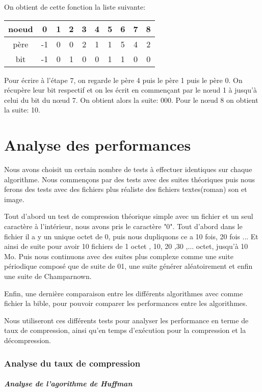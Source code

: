 \documentclass{report}
\begin{document}
On obtient de cette fonction la liste suivante:
\begin{center}
\begin{tabular}{|c|c|c|c|c|c|c|c|c|c|}
\hline
noeud & 0 & 1 & 2 & 3 & 4 & 5 & 6 & 7 & 8 \\
\hline
père & -1 & 0 & 0 & 2 & 1 & 1 & 5 & 4 & 2\\
\hline
bit & -1 & 0 & 1 & 0 & 0 & 1 & 1 & 0 & 0 \\
\hline 
\end{tabular}
\end{center}
 
Pour écrire à l'étape 7, on regarde le père 4 puis le père 1 puis le père 0. 
On récupère leur bit respectif et on les écrit en commençant par le nœud  1 à jusqu'à celui du bit du nœud 7. On obtient alors la suite: 000.
Pour le nœud 8 on obtient la suite: 10. 


\part{Analyse des performances}
Nous avons choisit un certain nombre de tests à effectuer identiques sur chaque algorithme. Nous commençons par des tests avec des suites théoriques puis nous ferons des tests avec des fichiers plus réaliste des fichiers textes(roman) son et image.
 
Tout d'abord un test de compression théorique simple avec un fichier et un seul caractère à l'intérieur, nous avons pris le caractère "0".
Tout d'abord dans le fichier il a y un unique octet de 0, puis nous dupliquons ce a 10 fois, 20 fois ... Et ainsi de suite pour avoir 10 fichiers de 1 octet , 10, 20 ,30 ,...  octet, jusqu'à 10 Mo.
Puis nous continuons avec des suites plus complexe comme une suite périodique composé que de suite de 01, une suite générer aléatoirement et enfin une suite de Champarnown.  

Enfin, une dernière comparaison entre les différents algorithmes avec comme fichier la bible, pour pouvoir comparer les performances entre les algorithmes.

Nous utiliseront ces différents tests pour analyser les performance en terme de taux de compression, ainsi qu'en temps d’exécution pour la compression et la décompression. 
\section*{Analyse du taux de compression}
\subsubsection{ Analyse de l'agorithme de Huffman}
\end{document}

